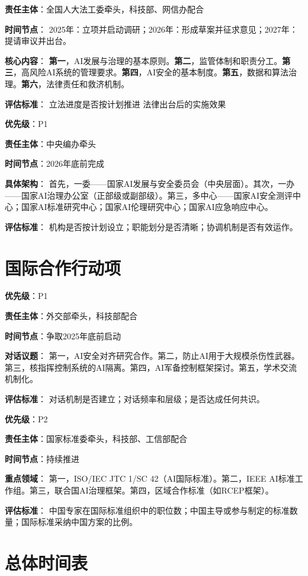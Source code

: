 \textbf{责任主体}：全国人大法工委牵头，科技部、网信办配合

\textbf{时间节点}：
2025年：立项并启动调研；2026年：形成草案并征求意见；2027年：提请审议并出台。

\textbf{核心内容}：
\textbf{第一}，AI发展与治理的基本原则。\textbf{第二}，监管体制和职责分工。\textbf{第三}，高风险AI系统的管理要求。\textbf{第四}，AI安全的基本制度。\textbf{第五}，数据和算法治理。\textbf{第六}，法律责任和救济机制。

\textbf{评估标准}：
立法进度是否按计划推进 法律出台后的实施效果

\textbf{优先级}：P1

\textbf{责任主体}：中央编办牵头

\textbf{时间节点}：2026年底前完成

\textbf{具体架构}：
首先，一委——国家AI发展与安全委员会（中央层面）。其次，一办——国家AI治理办公室（正部级或副部级）。第三，多中心——国家AI安全测评中心；国家AI标准研究中心；国家AI伦理研究中心；国家AI应急响应中心。

\textbf{评估标准}：
机构是否按计划设立；职能划分是否清晰；协调机制是否有效运作。

\section{国际合作行动项}

\textbf{优先级}：P1

\textbf{责任主体}：外交部牵头，科技部配合

\textbf{时间节点}：争取2025年底前启动

\textbf{对话议题}：
第一，AI安全对齐研究合作。第二，防止AI用于大规模杀伤性武器。第三，核指挥控制系统的AI隔离。第四，AI军备控制框架探讨。第五，学术交流机制化。

\textbf{评估标准}：
对话机制是否建立；对话频率和层级；是否达成任何共识。

\textbf{优先级}：P2

\textbf{责任主体}：国家标准委牵头，科技部、工信部配合

\textbf{时间节点}：持续推进

\textbf{重点领域}：
第一，ISO/IEC JTC 1/SC 42（AI国际标准）。第二，IEEE AI标准工作组。第三，联合国AI治理框架。第四，区域合作标准（如RCEP框架）。

\textbf{评估标准}：
中国专家在国际标准组织中的职位数；中国主导或参与制定的标准数量；国际标准采纳中国方案的比例。

\section{总体时间表}

